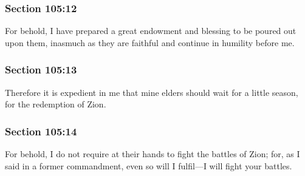 	\subsubsection{Section 105:12} %
		\label{DC105-12}

		For behold, I have prepared a great endowment and blessing to be poured out upon them, inasmuch as they are faithful and continue in humility before me.


	\subsubsection{Section 105:13} %
		\label{DC105-13}

		Therefore it is expedient in me that mine elders should wait for a little season, for the redemption of Zion.


	\subsubsection{Section 105:14} %
		\label{DC105-14}

		For behold, I do not require at their hands to fight the battles of Zion; for, as I said in a former commandment, even so will I fulfil—I will fight your battles.


